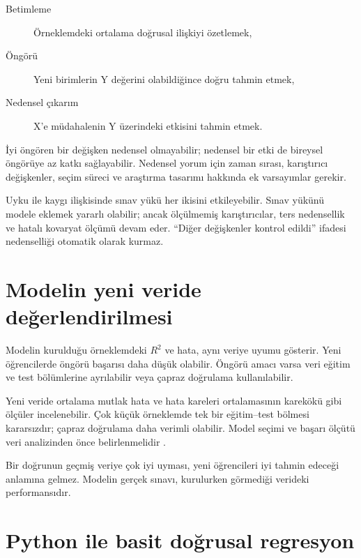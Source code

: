 \begin{description}
  \item[Betimleme] Örneklemdeki ortalama doğrusal ilişkiyi özetlemek,
  \item[Öngörü] Yeni birimlerin Y değerini olabildiğince doğru tahmin etmek,
  \item[Nedensel çıkarım] X'e müdahalenin Y üzerindeki etkisini tahmin etmek.
\end{description}

İyi öngören bir değişken nedensel olmayabilir; nedensel bir etki de bireysel
öngörüye az katkı sağlayabilir. Nedensel yorum için zaman sırası, karıştırıcı
değişkenler, seçim süreci ve araştırma tasarımı hakkında ek varsayımlar gerekir.

Uyku ile kaygı ilişkisinde sınav yükü her ikisini etkileyebilir. Sınav yükünü
modele eklemek yararlı olabilir; ancak ölçülmemiş karıştırıcılar, ters
nedensellik ve hatalı kovaryat ölçümü devam eder. ``Diğer değişkenler kontrol
edildi'' ifadesi nedenselliği otomatik olarak kurmaz.

\section{Modelin yeni veride değerlendirilmesi}

Modelin kurulduğu örneklemdeki $R^2$ ve hata, aynı veriye uyumu gösterir. Yeni
öğrencilerde öngörü başarısı daha düşük olabilir. Öngörü amacı varsa veri
eğitim ve test bölümlerine ayrılabilir veya çapraz doğrulama kullanılabilir.

Yeni veride ortalama mutlak hata ve hata kareleri ortalamasının karekökü gibi
ölçüler incelenebilir. Çok küçük örneklemde tek bir eğitim--test bölmesi
kararsızdır; çapraz doğrulama daha verimli olabilir. Model seçimi ve başarı
ölçütü veri analizinden önce belirlenmelidir \cite{hastie2009,james2021}.

\begin{sezgibox}
Bir doğrunun geçmiş veriye çok iyi uyması, yeni öğrencileri iyi tahmin edeceği
anlamına gelmez. Modelin gerçek sınavı, kurulurken görmediği verideki
performansıdır.
\end{sezgibox}

\section{Python ile basit doğrusal regresyon}

